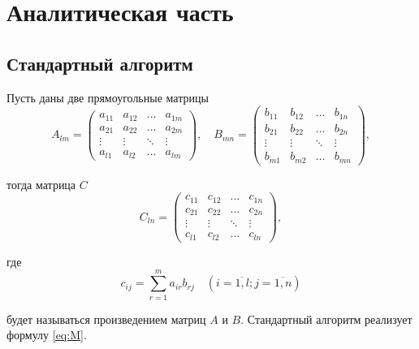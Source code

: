 \chapter{Аналитическая часть}

\section{Стандартный алгоритм}

Пусть даны две прямоугольные матрицы
\begin{equation}
    A_{lm} = \begin{pmatrix}
                 a_{11} & a_{12} & \ldots & a_{1m}\\
                 a_{21} & a_{22} & \ldots & a_{2m}\\
                 \vdots & \vdots & \ddots & \vdots\\
                 a_{l1} & a_{l2} & \ldots & a_{lm}
    \end{pmatrix},
    \quad
    B_{mn} = \begin{pmatrix}
                 b_{11} & b_{12} & \ldots & b_{1n}\\
                 b_{21} & b_{22} & \ldots & b_{2n}\\
                 \vdots & \vdots & \ddots & \vdots\\
                 b_{m1} & b_{m2} & \ldots & b_{mn}
    \end{pmatrix},
\end{equation}


тогда матрица $C$
\begin{equation}
    C_{ln} = \begin{pmatrix}
                 c_{11} & c_{12} & \ldots & c_{1n}\\
                 c_{21} & c_{22} & \ldots & c_{2n}\\
                 \vdots & \vdots & \ddots & \vdots\\
                 c_{l1} & c_{l2} & \ldots & c_{ln}
    \end{pmatrix},
\end{equation}

где
\begin{equation}
    \label{eq:M}
    c_{ij} =
    \sum_{r=1}^{m} a_{ir}b_{rj} \quad (i=\overline{1,l}; j=\overline{1,n})
\end{equation}

будет называться произведением матриц $A$ и $B$.
Стандартный алгоритм реализует формулу \eqref{eq:M}.

